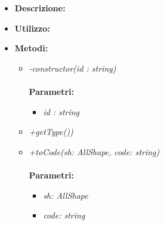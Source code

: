 \begin{itemize}
	\item \textbf{Descrizione:}\\
	
	\item \textbf{Utilizzo:}\\
	
	\item \textbf{Metodi:}
		\begin{itemize}
			\item \emph{-constructor(id : string)}\\
    		\\
    		\textbf{Parametri:}
    		\begin{itemize}
    			\item \emph{id : string}\\
    			
    		\end{itemize}
			\item \emph{+getType())}\\
    		
			\item \emph{+toCode(sh: AllShape, code: string)}\\
    		\\
    		\textbf{Parametri:}
    		\begin{itemize}
    			\item \emph{sh: AllShape}\\
    			
    			\item \emph{code: string}\\
    			
    		\end{itemize}
    	\end{itemize}
\end{itemize}